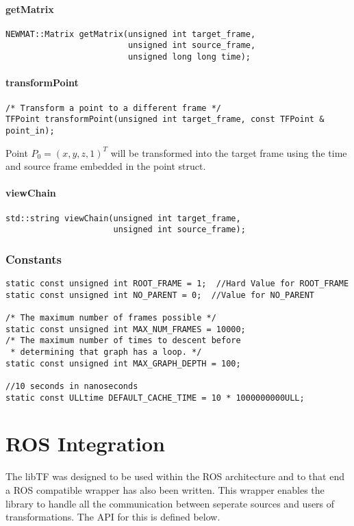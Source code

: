 \documentclass[12pt]{article}
\begin{document}
\paragraph{getMatrix}
\begin{verbatim}
NEWMAT::Matrix getMatrix(unsigned int target_frame,
                         unsigned int source_frame,
                         unsigned long long time); 
\end{verbatim}

\paragraph{transformPoint}
\begin{verbatim}
/* Transform a point to a different frame */
TFPoint transformPoint(unsigned int target_frame, const TFPoint & point_in);
\end{verbatim}
Point $P_0 = (x,y,z,1)^T$ will be transformed into the target frame
using the time and source frame embedded in the point struct.  

\paragraph{viewChain}
\begin{verbatim}
std::string viewChain(unsigned int target_frame, 
                      unsigned int source_frame);
\end{verbatim}

\subsubsection{Constants}
\begin{verbatim}
static const unsigned int ROOT_FRAME = 1;  //Hard Value for ROOT_FRAME
static const unsigned int NO_PARENT = 0;  //Value for NO_PARENT

/* The maximum number of frames possible */
static const unsigned int MAX_NUM_FRAMES = 10000;   
/* The maximum number of times to descent before 
 * determining that graph has a loop. */
static const unsigned int MAX_GRAPH_DEPTH = 100; 

//10 seconds in nanoseconds
static const ULLtime DEFAULT_CACHE_TIME = 10 * 1000000000ULL; 

\end{verbatim}

\section{ROS Integration}
The libTF was designed to be used within the ROS architecture and to that end 
a ROS compatible wrapper has also been written.  This wrapper enables the library
to handle all the communication between seperate sources and users of transformations.
The API for this is defined below.
\end{document}
